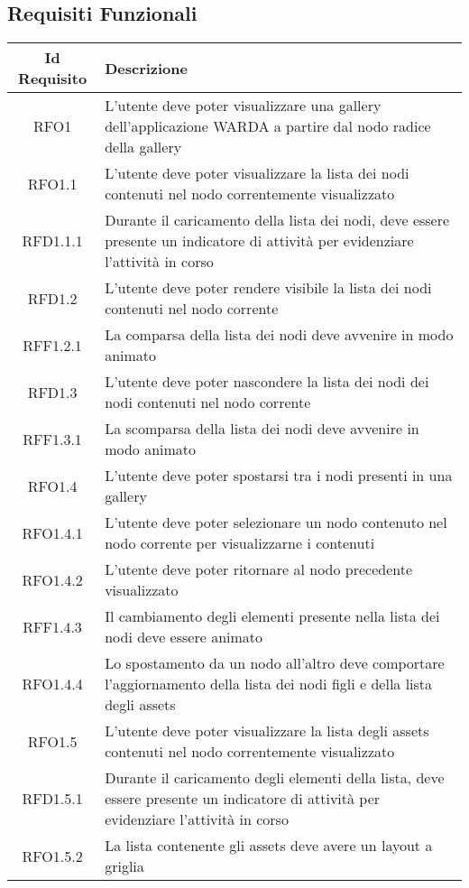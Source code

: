 \subsection{Requisiti Funzionali}
\normalsize
\begin{longtable}{|c|m{10cm}|}
\hline
\textbf{Id Requisito} & \textbf{Descrizione}\\
\hline
\endhead
RFO1 & L'utente deve poter visualizzare una gallery dell'applicazione WARDA a partire dal nodo radice della gallery \\ \hline
RFO1.1 & L'utente deve poter visualizzare la lista dei nodi contenuti nel nodo correntemente visualizzato \\ \hline
RFD1.1.1 & Durante il caricamento della lista dei nodi, deve essere presente un indicatore di attività per evidenziare l'attività in corso \\ \hline
RFD1.2 & L'utente deve poter rendere visibile la lista dei nodi contenuti nel nodo corrente \\ \hline
RFF1.2.1 & La comparsa della lista dei nodi deve avvenire in modo animato \\ \hline
RFD1.3 & L'utente deve poter nascondere la lista dei nodi dei nodi contenuti nel nodo corrente \\ \hline
RFF1.3.1 & La scomparsa della lista dei nodi deve avvenire in modo animato \\ \hline
RFO1.4 & L'utente deve poter spostarsi tra i nodi presenti in una gallery \\ \hline
RFO1.4.1 & L'utente deve poter selezionare un nodo contenuto nel nodo corrente per visualizzarne i contenuti \\ \hline
RFO1.4.2 & L'utente deve poter ritornare al nodo precedente visualizzato \\ \hline
RFF1.4.3 & Il cambiamento degli elementi presente nella lista dei nodi deve essere animato \\ \hline
RFO1.4.4 & Lo spostamento da un nodo all'altro deve comportare l'aggiornamento della lista dei nodi figli e della lista degli assets \\ \hline
RFO1.5 & L'utente deve poter visualizzare la lista degli assets contenuti nel nodo correntemente visualizzato \\ \hline
RFD1.5.1 & Durante il caricamento degli elementi della lista, deve essere presente un indicatore di attività per evidenziare l'attività in corso \\ \hline
RFO1.5.2 & La lista contenente gli assets deve avere un layout a griglia \\ \hline

\end{longtable}
